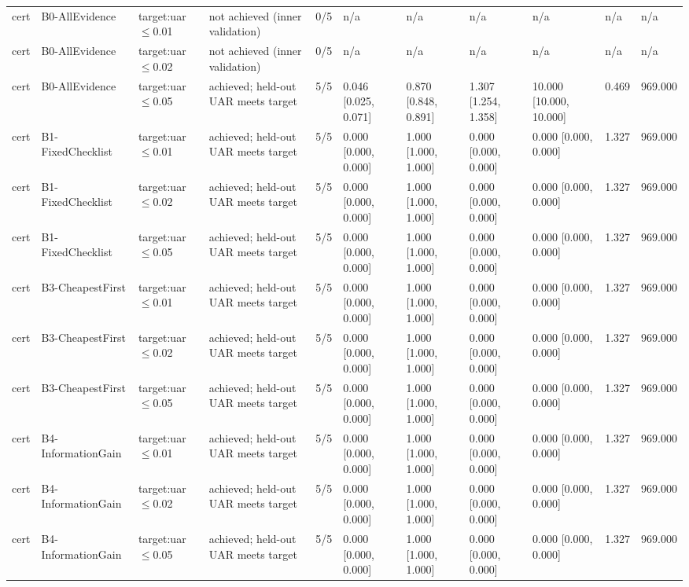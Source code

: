 \begin{table}[!ht]
{\begin{tabular}{lllllllllll}
cert & B0-AllEvidence & target:uar$\le$0.01 & not achieved (inner validation) & 0/5 & n/a & n/a & n/a & n/a & n/a & n/a \\
cert & B0-AllEvidence & target:uar$\le$0.02 & not achieved (inner validation) & 0/5 & n/a & n/a & n/a & n/a & n/a & n/a \\
cert & B0-AllEvidence & target:uar$\le$0.05 & achieved; held-out UAR meets target & 5/5 & 0.046 [0.025, 0.071] & 0.870 [0.848, 0.891] & 1.307 [1.254, 1.358] & 10.000 [10.000, 10.000] & 0.469 & 969.000 \\
cert & B1-FixedChecklist & target:uar$\le$0.01 & achieved; held-out UAR meets target & 5/5 & 0.000 [0.000, 0.000] & 1.000 [1.000, 1.000] & 0.000 [0.000, 0.000] & 0.000 [0.000, 0.000] & 1.327 & 969.000 \\
cert & B1-FixedChecklist & target:uar$\le$0.02 & achieved; held-out UAR meets target & 5/5 & 0.000 [0.000, 0.000] & 1.000 [1.000, 1.000] & 0.000 [0.000, 0.000] & 0.000 [0.000, 0.000] & 1.327 & 969.000 \\
cert & B1-FixedChecklist & target:uar$\le$0.05 & achieved; held-out UAR meets target & 5/5 & 0.000 [0.000, 0.000] & 1.000 [1.000, 1.000] & 0.000 [0.000, 0.000] & 0.000 [0.000, 0.000] & 1.327 & 969.000 \\
cert & B3-CheapestFirst & target:uar$\le$0.01 & achieved; held-out UAR meets target & 5/5 & 0.000 [0.000, 0.000] & 1.000 [1.000, 1.000] & 0.000 [0.000, 0.000] & 0.000 [0.000, 0.000] & 1.327 & 969.000 \\
cert & B3-CheapestFirst & target:uar$\le$0.02 & achieved; held-out UAR meets target & 5/5 & 0.000 [0.000, 0.000] & 1.000 [1.000, 1.000] & 0.000 [0.000, 0.000] & 0.000 [0.000, 0.000] & 1.327 & 969.000 \\
cert & B3-CheapestFirst & target:uar$\le$0.05 & achieved; held-out UAR meets target & 5/5 & 0.000 [0.000, 0.000] & 1.000 [1.000, 1.000] & 0.000 [0.000, 0.000] & 0.000 [0.000, 0.000] & 1.327 & 969.000 \\
cert & B4-InformationGain & target:uar$\le$0.01 & achieved; held-out UAR meets target & 5/5 & 0.000 [0.000, 0.000] & 1.000 [1.000, 1.000] & 0.000 [0.000, 0.000] & 0.000 [0.000, 0.000] & 1.327 & 969.000 \\
cert & B4-InformationGain & target:uar$\le$0.02 & achieved; held-out UAR meets target & 5/5 & 0.000 [0.000, 0.000] & 1.000 [1.000, 1.000] & 0.000 [0.000, 0.000] & 0.000 [0.000, 0.000] & 1.327 & 969.000 \\
cert & B4-InformationGain & target:uar$\le$0.05 & achieved; held-out UAR meets target & 5/5 & 0.000 [0.000, 0.000] & 1.000 [1.000, 1.000] & 0.000 [0.000, 0.000] & 0.000 [0.000, 0.000] & 1.327 & 969.000 \\

\end{tabular}}
\end{table}
